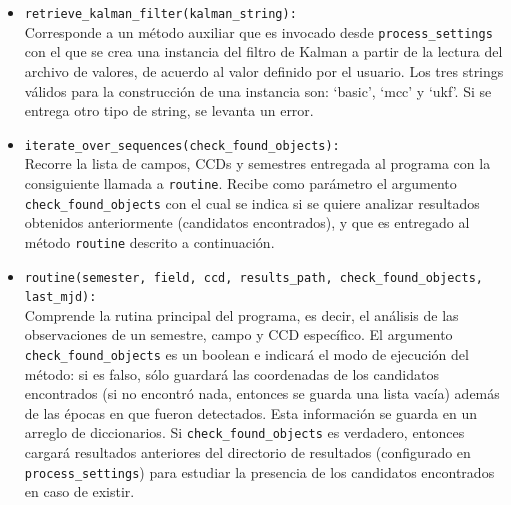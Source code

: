 \begin{appendix}
\begin{itemize}
\item \texttt{retrieve\_kalman\_filter(kalman\_string):}\\
Corresponde a un m\'etodo auxiliar que es invocado desde \texttt{process\_settings} con el que se crea una instancia del filtro de Kalman a partir de la lectura del archivo de valores, de acuerdo al valor definido por el usuario. Los tres strings v\'alidos para la construcci\'on de una instancia son: `basic', `mcc' y `ukf'. Si se entrega otro tipo de string, se levanta un error.
\bigskip
  
\item \texttt{iterate\_over\_sequences(check\_found\_objects):}\\
Recorre la lista de campos, CCDs y semestres entregada al programa con la consiguiente llamada a \texttt{routine}. Recibe como par\'ametro el argumento \texttt{check\_found\_objects} con el cual se indica si se quiere analizar resultados obtenidos anteriormente (candidatos encontrados), y que es entregado al m\'etodo \texttt{routine} descrito a continuaci\'on.
\bigskip

\item \texttt{routine(semester, field, ccd, results\_path, check\_found\_objects, last\_mjd):}\\
Comprende la rutina principal del programa, es decir, el an\'alisis de las observaciones de un semestre, campo y CCD espec\'ifico. El argumento \texttt{check\_found\_objects} es un boolean e indicar\'a el modo de ejecuci\'on del m\'etodo: si es falso, s\'olo guardar\'a las coordenadas de los candidatos encontrados (si no encontr\'o nada, entonces se guarda una lista vac\'ia) adem\'as de las \'epocas en que fueron detectados. Esta informaci\'on se guarda en un arreglo de diccionarios. Si \texttt{check\_found\_objects} es verdadero, entonces cargar\'a resultados anteriores del directorio de resultados (configurado en \texttt{process\_settings}) para estudiar la presencia de los candidatos encontrados en caso de existir.
\end{itemize}  
\bigskip
\pagebreak


\end{appendix}

